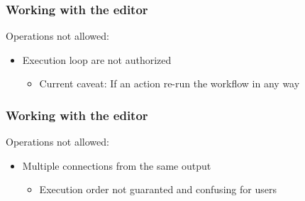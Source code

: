 \begin{frame}
    \frametitle{Working with the editor}
    Operations not allowed:
    \begin{itemize}
        \item Execution loop are not authorized
        \begin{itemize}
            \item Current caveat: If an action re-run the workflow in any way
        \end{itemize}
    \end{itemize}
    \begin{center}
    \end{center}
\end{frame}

\begin{frame}
    \frametitle{Working with the editor}
    Operations not allowed:
    \begin{itemize}
        \item Multiple connections from the same output
        \begin{itemize}
            \item Execution order not guaranted and confusing for users
        \end{itemize}
    \end{itemize}
    \begin{center}
    \end{center}
\end{frame}

